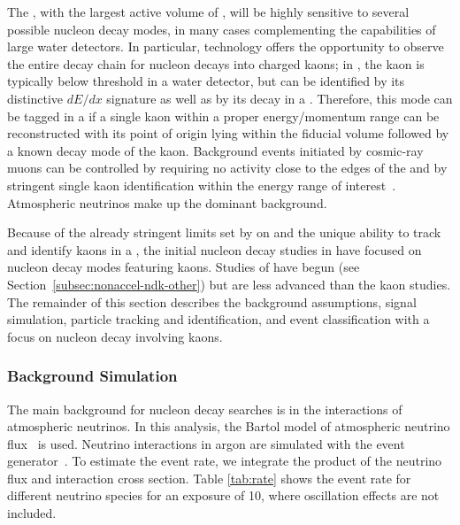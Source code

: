 The  , with the largest active volume of , 
will be highly sensitive to several possible nucleon decay modes, 
in many cases complementing the capabilities of large water detectors.
In particular,  technology offers the opportunity to observe the entire decay chain for nucleon decays into charged kaons; in \ptoknubar, the kaon is typically below \cherenkov threshold in a water \cherenkov detector, but can be identified by its distinctive $dE/dx$ signature as well as by its decay in a .
Therefore, this mode can be tagged in a  if a single kaon within a proper energy/momentum range can be reconstructed with its point of origin lying within the fiducial volume followed by a known decay mode of the kaon.
Background events initiated by cosmic-ray muons can be controlled  by requiring no activity close to the edges of the  and by stringent single kaon identification within the energy range of interest~\cite{bib:docdb3384,bib:docdb1752}.  Atmospheric neutrinos make up the dominant background.

Because of the already stringent limits set by \superk on \ptoepizero and the unique ability to track and identify kaons in a , the initial nucleon decay studies in  have focused on nucleon decay modes featuring kaons.  Studies of \ptoepizero have begun (see Section~\ref{subsec:nonaccel-ndk-other}) but are less advanced than the kaon studies.  The remainder of this section describes the background assumptions, signal simulation, particle tracking and identification, and event classification with a focus on nucleon decay involving kaons.

\subsubsection{Background Simulation}
\label{sec:ndkbkgd}

The main background for nucleon decay searches is in the interactions of  atmospheric neutrinos. In this analysis, the Bartol model of atmospheric neutrino flux~\cite{Barr:2004br} is used.
Neutrino interactions in argon are simulated with the  event generator~\cite{Andreopoulos:2009rq}. To estimate the event rate, we integrate the product of the neutrino flux and interaction cross section.
Table \ref{tab:rate} shows the event rate for different neutrino species for an exposure of \SI{10}{\ktyr}, where oscillation effects are not included.

